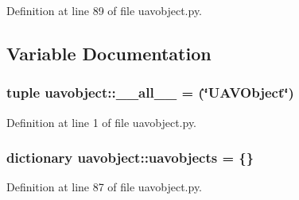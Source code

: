 \-Definition at line 89 of file uavobject.\-py.



\subsection{\-Variable \-Documentation}
\hypertarget{namespaceuavobject_af65f4577fc0b819a97f4a1d165fc3569}{
\subsubsection[{\-\_\-\-\_\-all\-\_\-\-\_\-}]{\setlength{\rightskip}{0pt plus 5cm}tuple {\bf uavobject\-::\-\_\-\-\_\-all\-\_\-\-\_\-} = (\char`\"{}\-U\-A\-V\-Object\char`\"{})}}\label{namespaceuavobject_af65f4577fc0b819a97f4a1d165fc3569}


\-Definition at line 1 of file uavobject.\-py.

\hypertarget{namespaceuavobject_a98779d297c2e6831d7bf513c6e40a889}{
\subsubsection[{uavobjects}]{\setlength{\rightskip}{0pt plus 5cm}dictionary {\bf uavobject\-::uavobjects} = \{\}}}\label{namespaceuavobject_a98779d297c2e6831d7bf513c6e40a889}


\-Definition at line 87 of file uavobject.\-py.

